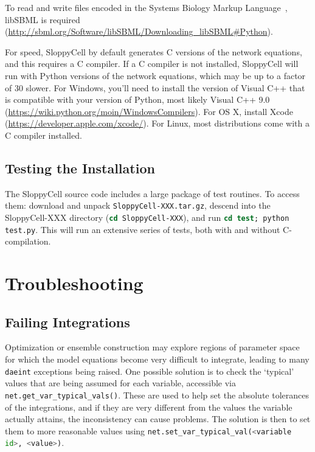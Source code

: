 \documentclass[12pt]{article}
\makeatletter
\newcommand{\py}[1]{\lstinline[language=Python, showstringspaces=False]@#1@}
\newcommand{\shell}[1]{\lstinline[language=csh, showstringspaces=False]!#1!}
\makeatother
\begin{document}
To read and write files encoded in the Systems Biology Markup Language~\cite{bib:Hucka2003}, libSBML is required (\url{http://sbml.org/Software/libSBML/Downloading_libSBML#Python}).

For speed, SloppyCell by default generates C versions of the network equations, and this requires a C compiler. 
If a C compiler is not installed, SloppyCell will run with Python versions of the network equations, which may be up to a factor of 30 slower.
For Windows, you'll need to install the version of Visual C++ that is compatible with your version of Python, most likely Visual C++ 9.0 (\url{https://wiki.python.org/moin/WindowsCompilers}).
For OS X, install Xcode (\url{https://developer.apple.com/xcode/}).
For Linux, most distributions come with a C compiler installed.

\subsection{Testing the Installation}\label{sec:test}
The SloppyCell source code includes a large package of test routines.
To access them: download and unpack \shell{SloppyCell-XXX.tar.gz}, descend into the SloppyCell-XXX directory (\shell{cd SloppyCell-XXX}), and run \shell{cd test; python test.py}.
This will run an extensive series of tests, both with and without C-compilation.

\section{Troubleshooting}
\subsection{Failing Integrations}
Optimization or ensemble construction may explore regions of parameter space for which the model equations become very difficult to integrate, leading to many \py{daeint} exceptions being raised.
One possible solution is to check the `typical' values that are being assumed for each variable, accessible via \py{net.get_var_typical_vals()}.
These are used to help set the absolute tolerances of the integrations, and if they are very different from the values the variable actually attains, the inconsistency can cause problems.
The solution is then to set them to more reasonable values using \py{net.set_var_typical_val(<variable id>, <value>)}.



\end{document}

